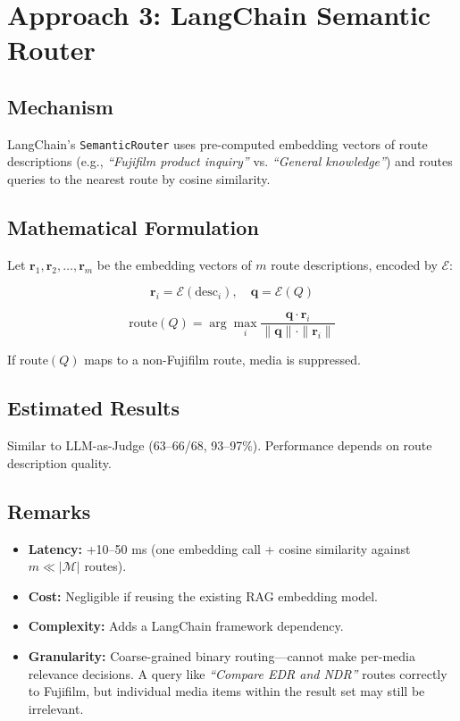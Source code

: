 \documentclass{article}
\begin{document}
\section{Approach 3: LangChain Semantic Router}

\subsection{Mechanism}
LangChain's \texttt{SemanticRouter} uses pre-computed embedding vectors of route descriptions (e.g., \textit{``Fujifilm product inquiry''} vs. \textit{``General knowledge''}) and routes queries to the nearest route by cosine similarity.

\subsection{Mathematical Formulation}
Let $\mathbf{r}_1, \mathbf{r}_2, \ldots, \mathbf{r}_m$ be the embedding vectors of $m$ route descriptions, encoded by $\mathcal{E}$:

\begin{equation}
\mathbf{r}_i = \mathcal{E}(\text{desc}_i), \quad \mathbf{q} = \mathcal{E}(Q)
\end{equation}

\begin{equation}
\text{route}(Q) = \arg\max_i \frac{\mathbf{q} \cdot \mathbf{r}_i}{\|\mathbf{q}\| \cdot \|\mathbf{r}_i\|}
\end{equation}

If $\text{route}(Q)$ maps to a non-Fujifilm route, media is suppressed.

\subsection{Estimated Results}
Similar to LLM-as-Judge (63--66/68, 93--97\%). Performance depends on route description quality.

\subsection{Remarks}
\begin{itemize}
  \item \textbf{Latency:} +10--50 ms (one embedding call + cosine similarity against $m \ll |\mathcal{M}|$ routes).
  \item \textbf{Cost:} Negligible if reusing the existing RAG embedding model.
  \item \textbf{Complexity:} Adds a LangChain framework dependency.
  \item \textbf{Granularity:} Coarse-grained binary routing—cannot make per-media relevance decisions. A query like \textit{``Compare EDR and NDR''} routes correctly to Fujifilm, but individual media items within the result set may still be irrelevant.
\end{itemize}
\end{document}
